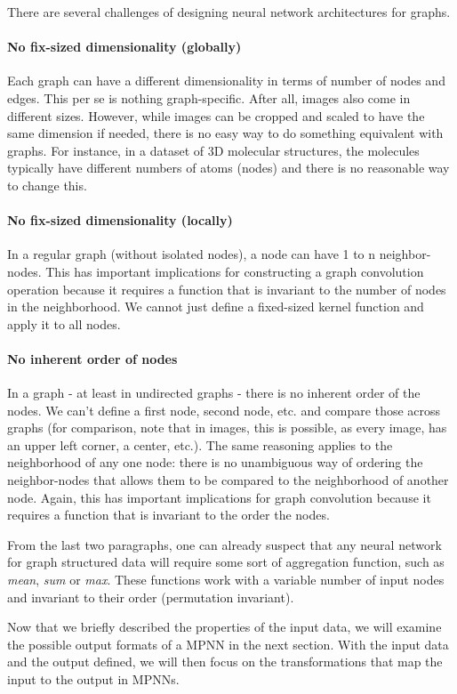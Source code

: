 There are several challenges of designing neural network architectures for graphs.

\paragraph{No fix-sized dimensionality (globally)}
Each graph can have a different dimensionality in terms of number of nodes and edges. This per se is nothing graph-specific. After all, images also come in different sizes. However, while images can be cropped and scaled to have the same dimension if needed, there is no easy way to do something equivalent with graphs. For instance, in a dataset of 3D molecular structures, the molecules typically have different numbers of atoms (nodes) and there is no reasonable way to change this.
\paragraph{No fix-sized dimensionality (locally)}
In a regular graph (without isolated nodes), a node can have 1 to n neighbor-nodes. This has important implications for constructing a graph convolution operation because it requires a function that is invariant to the number of nodes in the neighborhood. We cannot just define a fixed-sized kernel function and apply it to all nodes.
\paragraph{No inherent order of nodes}
In a graph - at least in undirected graphs - there is no inherent order of the nodes. We can't define a first node, second node, etc. and compare those across graphs (for comparison, note that in images, this is possible, as every image, has an upper left corner, a center, etc.). The same reasoning applies to the neighborhood of any one node: there is no unambiguous way of ordering the neighbor-nodes that allows them to be compared to the neighborhood of another node. Again, this has important implications for graph convolution because it requires a function that is invariant to the order the nodes.

From the last two paragraphs, one can already suspect that any neural network for graph structured data will require some sort of aggregation function, such as \textit{mean}, \textit{sum} or  \textit{max}. These functions work with a variable number of input nodes and invariant to their order (permutation invariant).

Now that we briefly described the properties of the input data, we will examine the possible output formats of a MPNN in the next section. With the input data and the output defined, we will then focus on the transformations that map the input to the output in MPNNs.

